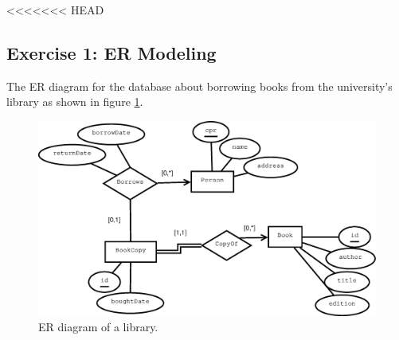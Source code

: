 <<<<<<< HEAD

\subsection{Exercise 1: ER Modeling}
The ER diagram for the database about borrowing books from the university's library as shown in figure \ref{fig:ss3-ex1-er}.

\begin{figure}[h]
  \centering
  \includegraphics[width=\linewidth]{3-12.03.14/exercise1.eps}
  \caption{ER diagram of a library.}\label{fig:ss3-ex1-er}
\end{figure}
